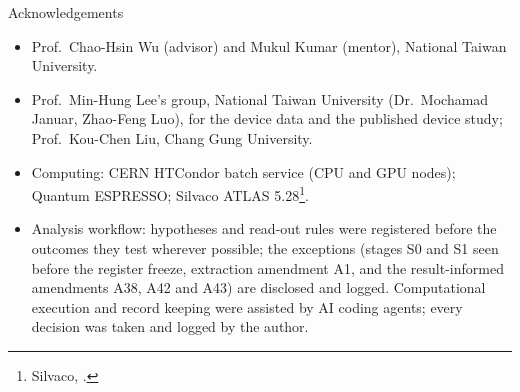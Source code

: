 \begin{frame}[t]{Acknowledgements}
  \begin{itemize}
    \item Prof.\ Chao-Hsin Wu (advisor) and Mukul Kumar (mentor), National Taiwan University.
    \item Prof.\ Min-Hung Lee's group, National Taiwan University (Dr.\ Mochamad Januar, Zhao-Feng Luo), for the
      device data and the published device study; Prof.\ Kou-Chen Liu, Chang Gung University.
    \item Computing: CERN HTCondor batch service (CPU and GPU nodes); Quantum
      ESPRESSO; Silvaco ATLAS 5.28\footnote[frame]{Silvaco, .}.
    \item Analysis workflow: hypotheses and read-out rules were registered before the outcomes they test wherever
      possible; the exceptions (stages S0 and S1 seen before the register freeze, extraction amendment A1, and the
      result-informed amendments A38, A42 and A43) are disclosed and logged. Computational execution and record keeping
      were assisted by AI coding agents; every decision was taken and logged by the author.
  \end{itemize}
\end{frame}

